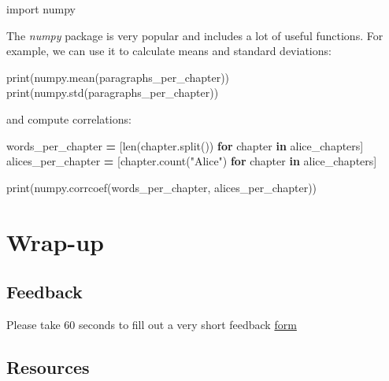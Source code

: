 \documentclass[]{book}
\newenvironment{Shaded}{\begin{snugshade}}{\end{snugshade}}
\newcommand{\KeywordTok}[1]{\textcolor[rgb]{0.13,0.29,0.53}{\textbf{#1}}}
\newcommand{\StringTok}[1]{\textcolor[rgb]{0.31,0.60,0.02}{#1}}
\newcommand{\ImportTok}[1]{#1}
\newcommand{\ControlFlowTok}[1]{\textcolor[rgb]{0.13,0.29,0.53}{\textbf{#1}}}
\newcommand{\OperatorTok}[1]{\textcolor[rgb]{0.81,0.36,0.00}{\textbf{#1}}}
\newcommand{\BuiltInTok}[1]{#1}
\newcommand{\NormalTok}[1]{#1}
\begin{document}
\begin{Shaded}
\begin{Highlighting}[]
\ImportTok{import}\NormalTok{ numpy}
\end{Highlighting}
\end{Shaded}

The \emph{numpy} package is very popular and includes a lot of useful
functions. For example, we can use it to calculate means and standard
deviations:

\begin{Shaded}
\begin{Highlighting}[]
\BuiltInTok{print}\NormalTok{(numpy.mean(paragraphs_per_chapter))}
\BuiltInTok{print}\NormalTok{(numpy.std(paragraphs_per_chapter))}
\end{Highlighting}
\end{Shaded}

and compute correlations:

\begin{Shaded}
\begin{Highlighting}[]
\NormalTok{words_per_chapter }\OperatorTok{=}\NormalTok{ [}\BuiltInTok{len}\NormalTok{(chapter.split()) }\ControlFlowTok{for}\NormalTok{ chapter }\KeywordTok{in}\NormalTok{ alice_chapters]}
\NormalTok{alices_per_chapter }\OperatorTok{=}\NormalTok{ [chapter.count(}\StringTok{"Alice"}\NormalTok{) }\ControlFlowTok{for}\NormalTok{ chapter }\KeywordTok{in}\NormalTok{ alice_chapters]}

\BuiltInTok{print}\NormalTok{(numpy.corrcoef(words_per_chapter, alices_per_chapter))}
\end{Highlighting}
\end{Shaded}

\section{Wrap-up}\label{wrap-up-4}

\subsection{Feedback}\label{feedback-4}

Please take 60 seconds to fill out a very short feedback
\href{http://bit.ly/training_class_eval}{form}

\subsection{Resources}\label{resources-4}
\end{document}
